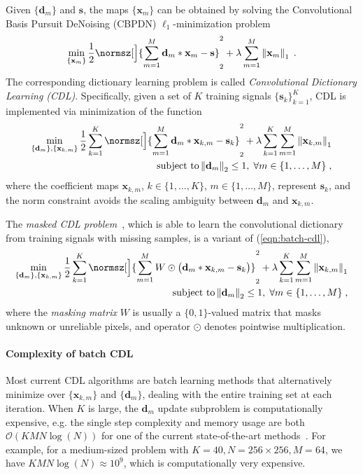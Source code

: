 \documentclass[final]{siamart1116}
\newcommand{\mb}[1]{\mathbf{#1}}
\providecommand{\norm}[1]{\left\lVert#1\right\rVert}
\def \co {\mathcal{O}}
\begin{document}
Given $\{\mb{d}_m\}$ and $\mb{s}$, the maps $\{\mb{x}_m\}$ can be obtained by solving the Convolutional Basis Pursuit DeNoising (CBPDN) $\ell_1$-minimization problem
\begin{align}
  \min_{\{\mb{x}_{m}\}} \frac{1}{2}
  \normsz[\Big]{\sum_{m=1}^M \mb{d}_m \ast \mb{x}_{m} - \mb{s}}_2^2 +
  \lambda  \sum_{m=1}^M \norm{\mb{x}_{m}}_1  \; .
\label{eq:cbpdn}
\end{align}
The corresponding dictionary learning problem is called \emph{Convolutional Dictionary Learning (CDL)}.  Specifically, given a set of $K$ training signals $\{\mb{s}_k\}_{k=1}^K$, CDL is implemented via minimization of the function
\begin{align}
\label{eqn:batch-cdl}
  \min_{\{\mb{d}_{m}\},\{\mb{x}_{k,m}\}} \frac{1}{2} \sum_{k=1}^K
  \normsz[\Big]{\sum_{m=1}^M \mb{d}_m \ast \mb{x}_{k,m} - \mb{s}_k}_2^2 +
  \lambda \sum_{k=1}^K \sum_{m=1}^M \norm{\mb{x}_{k,m}}_1   \nonumber \\
 \text{ subject to}  \norm{\mb{d}_{m}}_2 \leq 1,
\; \forall m \in \{1,\ldots,M\} \; ,
\end{align}
where the coefficient maps ${\mb{x}_{k,m}}$, $k \in \{1,\ldots,K\}$, $m \in \{1,\ldots,M\}$, represent $\mb{s}_k$, and the norm constraint avoids the scaling ambiguity between $\mb{d}_m$ and $\mb{x}_{k,m}$.

The \emph{masked CDL problem}~\cite{heide-2015-fast, wohlberg-2016-boundary}, which is able to learn the convolutional dictionary from training signals with missing samples, is a variant of (\ref{eqn:batch-cdl}),
\begin{align}
\label{eqn:batch-cdl-ms}
  \min_{\{\mb{d}_{m}\},\{\mb{x}_{k,m}\}} \frac{1}{2} \sum_{k=1}^K
  \normsz[\Big]{\sum_{m=1}^M W \odot \big( \mb{d}_m \ast \mb{x}_{k,m} - \mb{s}_k\big)}_2^2 +
  \lambda \sum_{k=1}^K \sum_{m=1}^M \norm{\mb{x}_{k,m}}_1   \nonumber \\
 \text{ subject to}  \norm{\mb{d}_{m}}_2 \leq 1,
\; \forall m \in \{1,\ldots,M\} \; ,
\end{align}
where the \emph{masking matrix} $W$ is usually a $\{0,1\}$-valued matrix that masks unknown or unreliable pixels, and operator $\odot$ denotes pointwise multiplication.

\paragraph{Complexity of batch CDL}
Most current CDL algorithms \cite{bristow-2013-fast, heide-2015-fast, gu-2015-convolutional, wohlberg-2016-efficient, sorel-2016-fast, wohlberg-2016-boundary, garcia-2017-subproblem, chun-2017-convolutional} are batch learning methods that alternatively minimize over $\{\mb{x}_{k,m}\}$ and $\{\mb{d}_{m}\}$, dealing with the entire training set at each iteration.
When $K$ is large, the $\mb{d}_m$ update subproblem is computationally expensive, e.g. the single step complexity and memory usage are both $\co(KMN\log(N))$ for one of the current state-of-the-art methods~\cite{sorel-2016-fast, garcia-2017-subproblem}. For example, for a medium-sized problem with $K=40, N=256\times256, M=64$, we have $KMN\log(N) \approx 10^9$, which is computationally very expensive.
\end{document}
